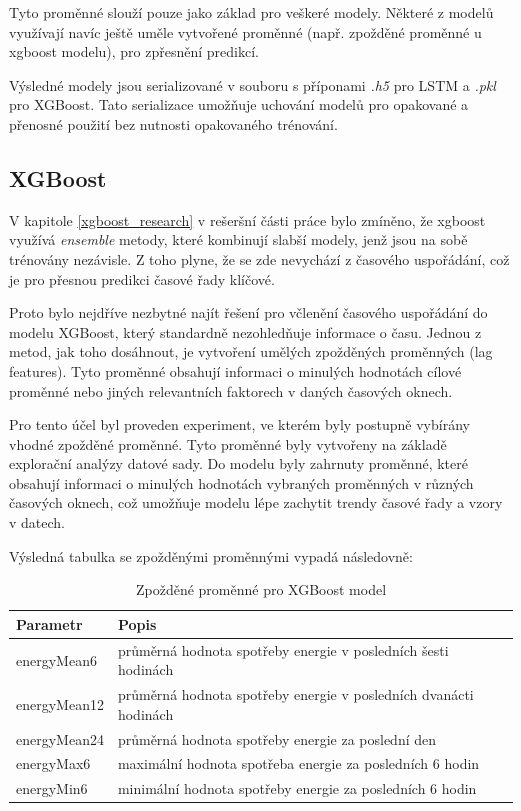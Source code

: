 \documentclass[FM,BP,fonts]{tulthesis}
\begin{document}
Tyto proměnné slouží pouze jako základ pro veškeré modely. Některé z modelů využívají navíc ještě uměle vytvořené proměnné (např. zpožděné proměnné u xgboost modelu), pro zpřesnění predikcí.

Výsledné modely jsou serializované v souboru s příponami \textit{.h5} pro LSTM a \textit{.pkl} pro XGBoost. Tato serializace umožňuje uchování modelů pro opakované a přenosné použití bez nutnosti opakovaného trénování.

\subsection{XGBoost}
V kapitole \ref{xgboost_research} v rešeršní části práce bylo zmíněno, že xgboost využívá \textit{ensemble} metody, které kombinují slabší modely, jenž jsou na sobě trénovány nezávisle. Z toho plyne, že se zde nevychází z časového uspořádání, což je pro přesnou predikci časové řady klíčové.

Proto bylo nejdříve nezbytné najít řešení pro včlenění časového uspořádání do modelu XGBoost, který standardně nezohledňuje informace o času. Jednou z metod, jak toho dosáhnout, je vytvoření umělých zpožděných proměnných (lag features). Tyto proměnné obsahují informaci o minulých hodnotách cílové proměnné nebo jiných relevantních faktorech v daných časových oknech.

Pro tento účel byl proveden experiment, ve kterém byly postupně vybírány vhodné zpožděné proměnné. Tyto proměnné byly vytvořeny na základě explorační analýzy datové sady. Do modelu byly zahrnuty proměnné, které obsahují informaci o minulých hodnotách vybraných proměnných v různých časových oknech, což umožňuje modelu lépe zachytit trendy časové řady a vzory v datech. 

Výsledná tabulka se zpožděnými proměnnými vypadá následovně: 

\begin{table}[!ht]
	\centering
	\caption{Zpožděné proměnné pro XGBoost model}
	
	\begin{tabularx}{\linewidth}{lX}
		\hline
		\textbf{Parametr} & \textbf{Popis} \\ \hline
		energyMean6 & průměrná hodnota spotřeby energie v posledních šesti hodinách \\
		energyMean12 & průměrná hodnota spotřeby energie v posledních dvanácti hodinách \\
		energyMean24 & průměrná hodnota spotřeby energie za poslední den \\
		energyMax6 & maximální hodnota spotřeba energie za posledních 6 hodin\\
		energyMin6 & minimální hodnota spotřeby energie za posledních 6 hodin\\
	\end{tabularx}
\end{table}
\end{document}
